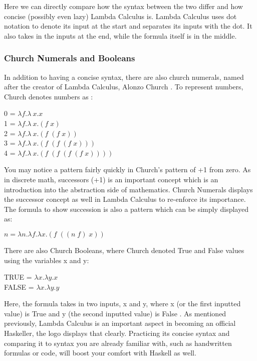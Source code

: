 \documentclass{article}
\begin{document}
\noindent
Here we can directly compare how the syntax between the two differ and how concise (possibly even lazy) Lambda Calculus is. Lambda Calculus uses dot notation to denote its input at the start and separates its inputs with the dot. It also takes in the inputs at the end, while the formula itself is in the middle.

\subsubsection{Church Numerals and Booleans}

In addition to having a concise syntax, there are also church numerals, named after the creator of Lambda Calculus, Alonzo Church \cite{Lambda Calculus}. To represent numbers, Church denotes numbers as \cite{CN}:

\begin{center}
    0 = $\lambda f. \lambda\ x.x$ \\
    1 = $\lambda f. \lambda\ x.(f \; x)$ \\
    2 = $\lambda f. \lambda\ x.(f \; (f \; x))$ \\
    3 = $\lambda f. \lambda\ x.(f \; (f \; (f \; x)))$ \\
    4 = $\lambda f. \lambda\ x.(f \; (f \; (f \; (f \; x))))$ \\
\end{center}

\noindent
You may notice a pattern fairly quickly in Church's pattern of +1 from zero. As in discrete math, successors (+1) is an important concept which is an introduction into the abstraction side of mathematics. Church Numerals displays the successor concept as well in Lambda Calculus to re-enforce its importance. The formula to show succession is also a pattern which can be simply displayed as:

\begin{center}
   $ n = \lambda n. \lambda f. \lambda x.(f \; ((n \; f) \; x))$
\end{center}

\noindent 
There are also Church Booleans, where Church denoted True and False values using the variables x and y:

\begin{center}
    TRUE = $\lambda x.  \lambda y.x$ \\
    FALSE = $\lambda x.  \lambda y.y$ \\
\end{center}

\noindent
Here, the formula takes in two inputs, x and y, where x (or the first inputted value) is True and y (the second inputted value) is False \cite{CN}. As mentioned previously, Lambda Calculus is an important aspect in becoming an official Haskeller, the logo displays that clearly. Practicing its concise syntax and comparing it to syntax you are already familiar with, such as handwritten formulas or code, will boost your comfort with Haskell as well.
\end{document}

